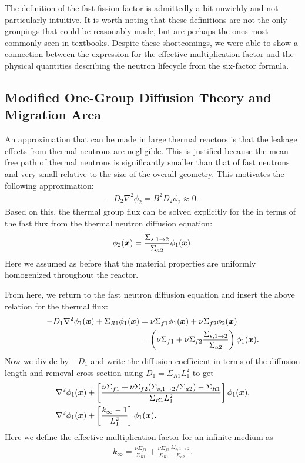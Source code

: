 The definition of the fast-fission factor is admittedly a bit unwieldy and not particularly intuitive. It is worth noting that these definitions are not the only groupings that could be reasonably made, but are perhaps the ones most commonly seen in textbooks. Despite these shortcomings, we were able to show a connection between the expression for the effective multiplication factor and the physical quantities describing the neutron lifecycle from the six-factor formula.

\subsection{Modified One-Group Diffusion Theory and Migration Area}

An approximation that can be made in large thermal reactors is that the leakage effects from thermal neutrons are negligible. This is justified because the mean-free path of thermal neutrons is significantly smaller than that of fast neutrons and very small relative to the size of the overall geometry. This motivates the following approximation:
\begin{align}
  -D_2 \nabla^2 \phi_2 = B^2 D_2 \phi_2 \approx 0.
\end{align}
Based on this, the thermal group flux can be solved explicitly for the in terms of the fast flux from the thermal neutron diffusion equation:
\begin{align}
  \phi_2(\bm{x}) = \frac{\Sigma_{s,1\rightarrow 2}}{\Sigma_{a2}} \phi_1(\bm{x}) .
\end{align}
Here we assumed as before that the material properties are uniformly homogenized throughout the reactor.

From here, we return to the fast neutron diffusion equation and insert the above relation for the thermal flux:
\begin{align}
  -D_1 \nabla^2 \phi_1(\bm{x}) + \Sigma_{R1} \phi_1(\bm{x}) 
  &= \nu\Sigma_{f1} \phi_1(\bm{x}) + \nu\Sigma_{f2} \phi_2(\bm{x}) \nonumber \\
  &= \left( \nu\Sigma_{f1} + \nu\Sigma_{f2} \frac{\Sigma_{s,1\rightarrow 2}}{\Sigma_{a2}} \right) \phi_1(\bm{x}) .
\end{align}
Now we divide by $-D_1$ and write the diffusion coefficient in terms of the diffusion length and removal cross section using $D_1 = \Sigma_{R1} L_1^2$ to get
\begin{align}
  &\nabla^2\phi_1(\bm{x}) + \left[ \frac{ \nu\Sigma_{f1} + \nu\Sigma_{f2} ( \Sigma_{s,1\rightarrow 2} / \Sigma_{a2} ) - \Sigma_{R1} }{ \Sigma_{R1} L_1^2 } \right] \phi_1(\bm{x}), \nonumber \\
  &\nabla^2\phi_1(\bm{x}) + \left[ \frac{ k_\infty - 1 }{ L_1^2 } \right] \phi_1(\bm{x}).
\end{align}
Here we define the effective multiplication factor for an infinite medium as
\begin{align}
  k_\infty = \frac{  \nu\Sigma_{f1} }{ \Sigma_{R1} } + \frac{ \nu\Sigma_{f2} }{ \Sigma_{R1} } \frac{\Sigma_{s,1\rightarrow 2}}{\Sigma_{a2}} .
\end{align}

